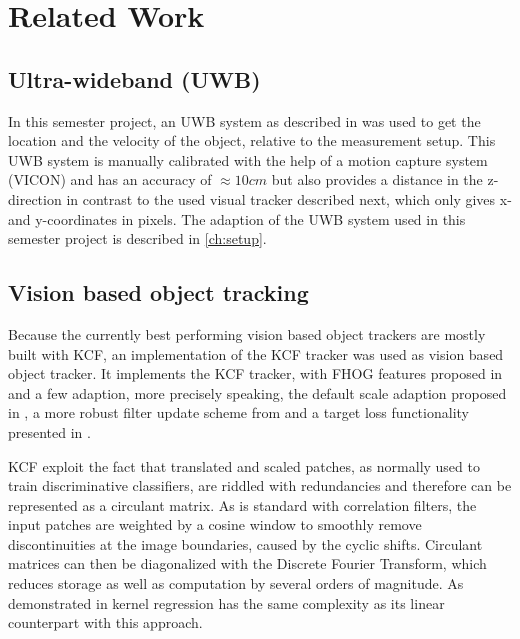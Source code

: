 
\setcounter{chapter}{1}

\chapter{Related Work}

\section{Ultra-wideband (UWB)}
In this semester project, an \ac{UWB} system as described in \cite{Naegeli:2016} was used to get the location and the velocity of the object, relative to the measurement setup. This \ac{UWB} system is manually calibrated with the help of a motion capture system (VICON) and has an accuracy of $\approx 10 cm$ but also provides a distance in the z-direction in contrast to the used visual tracker described next, which only gives x- and y-coordinates in pixels. The adaption of the \ac{UWB} system used in this semester project is described in \autoref{ch:setup}.

\section{Vision based object tracking}
Because the currently best performing vision based object trackers are mostly built with \ac{KCF}, an implementation of the \ac{KCF} tracker \cite{henriques2015tracking} was used as vision based object tracker\cite{Haag:2015}. It implements the \ac{KCF} tracker, with FHOG features proposed in \cite{lsvm-pami} and a few adaption, more precisely speaking, the default scale adaption proposed in \cite{danelljan2014dsst}, a more robust filter update scheme from \cite{danelljan2014colorattributes} and a target loss functionality presented in \cite{bolme2010mosse}.

\ac{KCF} exploit the fact that translated and scaled patches, as normally used to train discriminative classifiers, are riddled with redundancies and therefore can be represented as a circulant matrix. As is standard with correlation filters, the input patches are weighted by a cosine window to smoothly remove discontinuities at the image boundaries, caused by the cyclic shifts. Circulant matrices can then be diagonalized with the Discrete Fourier Transform, which reduces storage as well as computation by several orders of magnitude. As demonstrated in \cite{henriques2015tracking} kernel regression has the same complexity as its linear counterpart with this approach.


